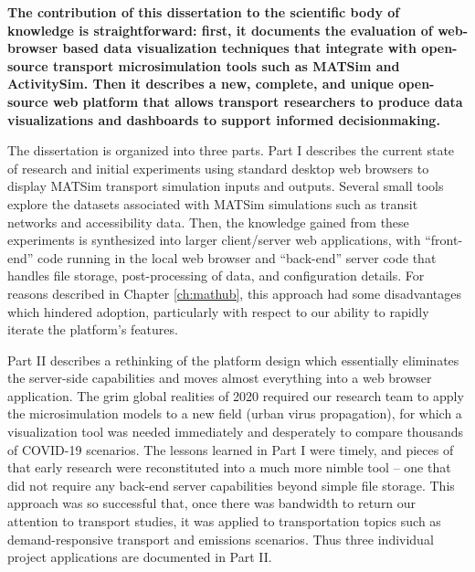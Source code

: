 \textbf{The contribution of this dissertation to the scientific body of knowledge is straightforward: first, it documents the evaluation of web-browser based data visualization techniques that integrate with open-source transport microsimulation tools such as MATSim and ActivitySim. Then it describes a new, complete, and unique open-source web platform that allows transport researchers to produce data visualizations and dashboards to support informed decisionmaking.}

The dissertation is organized into three parts. Part I describes the current state of research and initial experiments using standard desktop web browsers to display MATSim transport simulation inputs and outputs. Several small tools explore the datasets associated with MATSim simulations such as transit networks and accessibility data. Then, the knowledge gained from these experiments is synthesized into larger client/server web applications, with ``front-end'' code running in the local web browser and ``back-end'' server code that handles file storage, post-processing of data, and configuration details. For reasons described in Chapter \ref{ch:mathub}, this approach had some disadvantages which hindered adoption, particularly with respect to our ability to rapidly iterate the platform's features.

Part II describes a rethinking of the platform design which essentially eliminates the server-side capabilities and moves almost everything into a web browser application. The grim global realities of 2020 required our research team to apply the microsimulation models to a new field (urban virus propagation), for which a visualization tool was needed immediately and desperately to compare thousands of COVID-19 scenarios. The lessons learned in Part I were timely, and pieces of that early research were reconstituted into a much more nimble tool -- one that did not require any back-end server capabilities beyond simple file storage. This approach was so successful that, once there was bandwidth to return our attention to transport studies, it was applied to transportation topics such as demand-responsive transport and emissions scenarios. Thus three individual project applications are documented in Part II.

